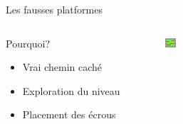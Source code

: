 \documentclass{beamer}
\begin{document}
{\begin{frame}{Les fausses platformes}
    \begin{columns}
        \begin{block}{Pourquoi?}
            \begin{itemize}
                \item[\bullet] Vrai chemin caché
                \item[\bullet] Exploration du niveau
                \item[\bullet] Placement des écrous
            \end{itemize}
        \end{block}
        \begin{figure}
            \centering
            \includegraphics[width=1.0\textwidth]{fake_platforms}
        \end{figure}
    \end{columns}
\end{frame}

}
\end{document}
